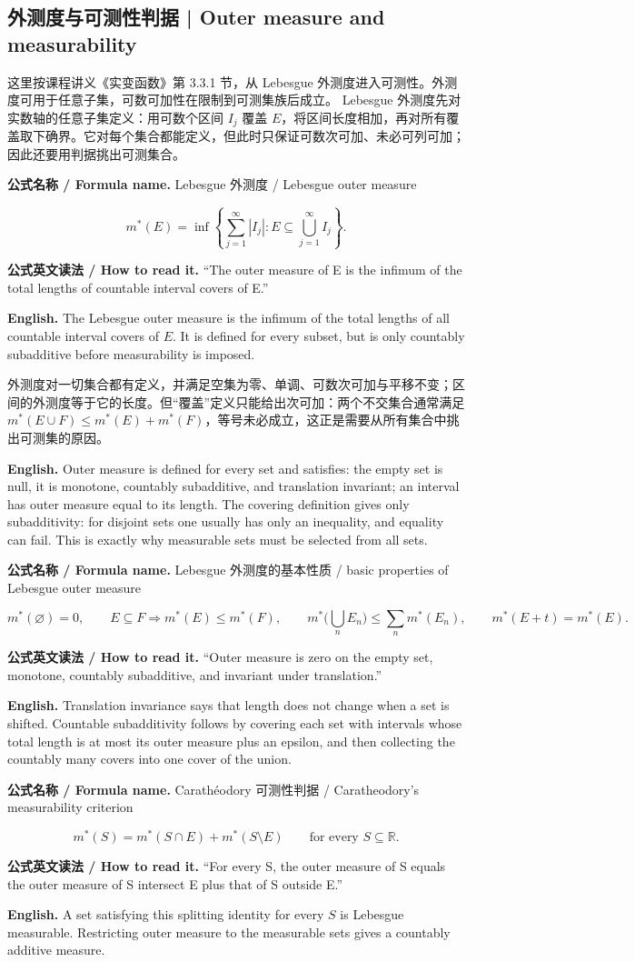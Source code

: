 \documentclass[UTF8,11pt,a4paper]{ctexart}
\newcommand{\EN}[1]{\par\noindent\textbf{English.} #1\par}
\newcommand{\READ}[1]{\par\noindent\textbf{公式英文读法 / How to read it.} #1\par}
\let\APSsubsection\subsection
\renewcommand{\subsection}[1]{\Needspace{6\baselineskip}\APSsubsection{#1}}
\newcommand{\FORMULA}[2]{\par\Needspace{3\baselineskip}\noindent\textbf{公式名称 / Formula name.} #1 / #2\par}
\begin{document}
\subsection{外测度与可测性判据 | Outer measure and measurability}
\noindent 这里按课程讲义《实变函数》第 3.3.1 节，从 Lebesgue 外测度进入可测性。外测度可用于任意子集，可数可加性在限制到可测集族后成立。
\noindent Lebesgue 外测度先对实数轴的任意子集定义：用可数个区间 $I_j$ 覆盖 $E$，将区间长度相加，再对所有覆盖取下确界。它对每个集合都能定义，但此时只保证可数次可加、未必可列可加；因此还要用判据挑出可测集合。
\FORMULA{Lebesgue 外测度}{Lebesgue outer measure}
\[
m^*(E)=\inf\left\{\sum_{j=1}^{\infty}|I_j|:
E\subseteq\bigcup_{j=1}^{\infty}I_j\right\}.
\]
\READ{“The outer measure of E is the infimum of the total lengths of countable interval covers of E.”}
\EN{The Lebesgue outer measure is the infimum of the total lengths of all countable interval covers of $E$. It is defined for every subset, but is only countably subadditive before measurability is imposed.}
\noindent 外测度对一切集合都有定义，并满足空集为零、单调、可数次可加与平移不变；区间的外测度等于它的长度。但“覆盖”定义只能给出次可加：两个不交集合通常满足 $m^*(E\cup F)\le m^*(E)+m^*(F)$，等号未必成立，这正是需要从所有集合中挑出可测集的原因。
\EN{Outer measure is defined for every set and satisfies: the empty set is null, it is monotone, countably subadditive, and translation invariant; an interval has outer measure equal to its length. The covering definition gives only subadditivity: for disjoint sets one usually has only an inequality, and equality can fail. This is exactly why measurable sets must be selected from all sets.}
\FORMULA{Lebesgue 外测度的基本性质}{basic properties of Lebesgue outer measure}
\[
m^*(\varnothing)=0,\qquad
E\subseteq F\Rightarrow m^*(E)\le m^*(F),\qquad
m^*\Big(\bigcup_{n}E_n\Big)\le\sum_{n}m^*(E_n),\qquad
m^*(E+t)=m^*(E).
\]
\READ{“Outer measure is zero on the empty set, monotone, countably subadditive, and invariant under translation.”}
\EN{Translation invariance says that length does not change when a set is shifted. Countable subadditivity follows by covering each set with intervals whose total length is at most its outer measure plus an epsilon, and then collecting the countably many covers into one cover of the union.}
\FORMULA{Carath\'eodory 可测性判据}{Caratheodory's measurability criterion}
\[
m^*(S)=m^*(S\cap E)+m^*(S\setminus E)
\qquad\text{for every }S\subseteq\mathbb R.
\]
\READ{“For every S, the outer measure of S equals the outer measure of S intersect E plus that of S outside E.”}
\EN{A set satisfying this splitting identity for every $S$ is Lebesgue measurable. Restricting outer measure to the measurable sets gives a countably additive measure.}
\end{document}
